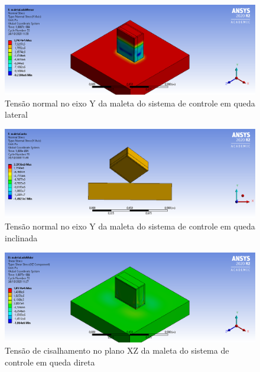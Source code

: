 \begin{apendicesenv}
\begin{figure}[htb]
    \centering
    \includegraphics[width=1.0\textwidth, angle=0]{figuras/estrutura_simulacaoImpacto/maletaNormalYMenor.png}
    \caption{Tensão normal no eixo Y da maleta do sistema de controle em queda lateral}
    \label{fig:simulacaoImpacto_20}
\end{figure}

\begin{figure}[htb]
    \centering
    \includegraphics[width=1.0\textwidth, angle=0]{figuras/estrutura_simulacaoImpacto/maletaNormalYCanto.png}
    \caption{Tensão normal no eixo Y da maleta do sistema de controle em queda inclinada}
    \label{fig:simulacaoImpacto_21}
\end{figure}

\begin{figure}[htb]
    \centering
    \includegraphics[width=1.0\textwidth, angle=0]{figuras/estrutura_simulacaoImpacto/maletaCisalhamentoXZMaior.png}
    \caption{Tensão de cisalhamento no plano XZ da maleta do sistema de controle em queda direta}
    \label{fig:simulacaoImpacto_22}
\end{figure}


\end{apendicesenv}
